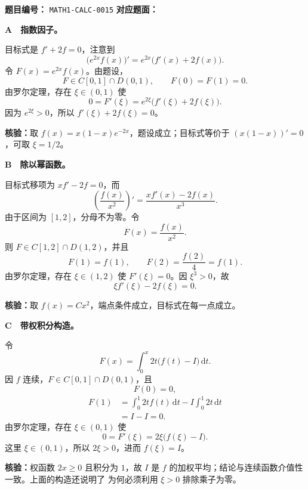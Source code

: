 \begin{problemMeta}
\textbf{题目编号：} \texttt{MATH1-CALC-0015}\quad
\textbf{对应题面：} 
\end{problemMeta}

\begin{solutionBox}
\textbf{A　指数因子。}

目标式是 \(f'+2f=0\)，注意到
\[
\bigl(e^{2x}f(x)\bigr)'=e^{2x}\bigl(f'(x)+2f(x)\bigr).
\]
令 \(F(x)=e^{2x}f(x)\)。由题设，
\[
F\in C[0,1]\cap D(0,1),\qquad F(0)=F(1)=0.
\]
由罗尔定理，存在 \(\xi\in(0,1)\) 使
\[
0=F'(\xi)=e^{2\xi}\bigl(f'(\xi)+2f(\xi)\bigr).
\]
因为 \(e^{2\xi}>0\)，所以 \(f'(\xi)+2f(\xi)=0\)。

\textbf{核验：}取 \(f(x)=x(1-x)e^{-2x}\)，题设成立；目标式等价于
\((x(1-x))'=0\)，可取 \(\xi=1/2\)。
\end{solutionBox}

\begin{solutionBox}
\textbf{B　除以幂函数。}

目标式移项为 \(xf'-2f=0\)，而
\[
\left(\frac{f(x)}{x^2}\right)'
=\frac{xf'(x)-2f(x)}{x^3}.
\]
由于区间为 \([1,2]\)，分母不为零。令
\[
F(x)=\frac{f(x)}{x^2}.
\]
则 \(F\in C[1,2]\cap D(1,2)\)，并且
\[
F(1)=f(1),\qquad F(2)=\frac{f(2)}4=f(1).
\]
由罗尔定理，存在 \(\xi\in(1,2)\) 使 \(F'(\xi)=0\)。因
\(\xi^3>0\)，故
\[
\xi f'(\xi)-2f(\xi)=0.
\]

\textbf{核验：}取 \(f(x)=Cx^2\)，端点条件成立，目标式在每一点成立。
\end{solutionBox}

\begin{solutionBox}
\textbf{C　带权积分构造。}

令
\[
F(x)=\int_0^x 2t\bigl(f(t)-I\bigr)\,\mathrm dt.
\]
因 \(f\) 连续，\(F\in C[0,1]\cap D(0,1)\)，且
\[
F(0)=0,
\]
\[
\begin{aligned}
F(1)
&=\int_0^1 2t f(t)\,\mathrm dt
  -I\int_0^1 2t\,\mathrm dt\\
&=I-I=0.
\end{aligned}
\]
由罗尔定理，存在 \(\xi\in(0,1)\) 使
\[
0=F'(\xi)=2\xi\bigl(f(\xi)-I\bigr).
\]
这里 \(\xi\in(0,1)\)，所以 \(2\xi>0\)，进而 \(f(\xi)=I\)。

\textbf{核验：}权函数 \(2x\ge0\) 且积分为 \(1\)，故 \(I\) 是
\(f\) 的加权平均；结论与连续函数介值性一致。上面的构造还说明了
为何必须利用 \(\xi>0\) 排除乘子为零。
\end{solutionBox}

